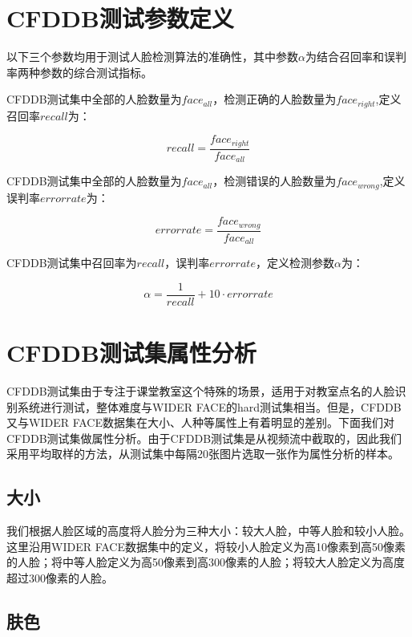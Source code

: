 \section{CFDDB测试参数定义}

以下三个参数均用于测试人脸检测算法的准确性，其中参数$\alpha$为结合召回率和误判率两种参数的综合测试指标。

CFDDB测试集中全部的人脸数量为$face_{all}$，检测正确的人脸数量为$face_{right}$,定义召回率$recall$为：

\begin{equation}
\label{eq:rdef}
recall = \frac{face_{right}}{face_{all}} 
\end{equation}

CFDDB测试集中全部的人脸数量为$face_{all}$，检测错误的人脸数量为$face_{wrong}$,定义误判率$errorrate$为：

\begin{equation}
\label{eq:edef}
errorrate = \frac{face_{wrong}}{face_{all}} 
\end{equation}

CFDDB测试集中召回率为$recall$，误判率$errorrate$，定义检测参数$\alpha$为：

\begin{equation}
\label{eq:alphadef}
\alpha = \frac{1}{recall} + 10\cdot errorrate
\end{equation}

\section{CFDDB测试集属性分析}

CFDDB测试集由于专注于课堂教室这个特殊的场景，适用于对教室点名的人脸识别系统进行测试，整体难度与WIDER FACE\cite{yang2016wider}的hard测试集相当。但是，CFDDB又与WIDER FACE数据集在大小、人种等属性上有着明显的差别。下面我们对CFDDB测试集做属性分析。由于CFDDB测试集是从视频流中截取的，因此我们采用平均取样的方法，从测试集中每隔20张图片选取一张作为属性分析的样本。

\subsection{大小}

我们根据人脸区域的高度将人脸分为三种大小：较大人脸，中等人脸和较小人脸。这里沿用WIDER FACE数据集中的定义，将较小人脸定义为高10像素到高50像素的人脸；将中等人脸定义为高50像素到高300像素的人脸；将较大人脸定义为高度超过300像素的人脸。

\subsection{肤色}

